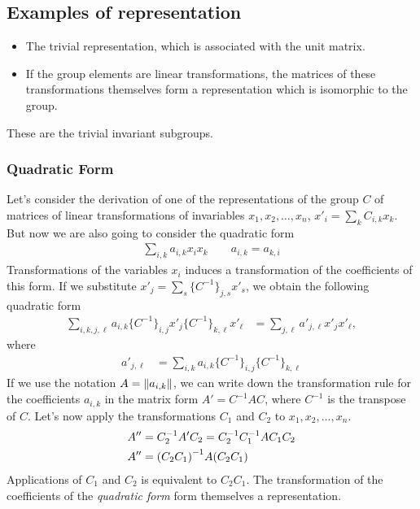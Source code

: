 \subsection{Examples of representation} %
\label{sub:Examples of representation}

\begin{itemize}
    \item The trivial representation, which is associated with the unit matrix.
    \item If the group elements are linear transformations, the matrices of these
        transformations themselves form a representation which is isomorphic to
        the group.
\end{itemize}
These are the trivial invariant subgroups.

\subsubsection{Quadratic Form}
Let's consider the derivation of one of the representations of the group
$C$ of matrices of linear transformations of invariables
$x_1,x_2,\dots,x_n$, $x'_i=\sum_kC_{i,k}x_k$. But now we are also going
to consider the quadratic form
\begin{align}
    \sum_{i,k}a_{i,k}x_ix_k\qquad a_{i,k}=a_{k,i}
\end{align}
Transformations of the variables $x_i$ induces a transformation of the
coefficients of this form. If we substitute
$x'_j=\sum_s\{C^{-1}\}_{j,s}x'_s$, we obtain the following quadratic form
\begin{align}
    \sum_{i,k,j,\ell}a_{i,k}\{C^{-1}\}_{i,j}x'_j\{C^{-1}\}_{k,\ell}x'_\ell
    &=\sum_{j,\ell}a'_{j,\ell}x'_jx'_\ell,
\end{align}
where
\begin{align}
    a'_{j,\ell}&=\sum_{i,k}a_{i,k}\{C^{-1}\}_{i,j}\{C^{-1}\}_{k,\ell}
\end{align}
If we use the notation $A=\norm{a_{i,k}}$, we can write down the transformation
rule for the coefficients $a_{i,k}$ in the matrix form $A'=C^{-1}AC$,
where $C^{-1}$ is the transpose of $C$. Let's now apply the
transformations $C_1$ and $C_2$ to $x_1,x_2,\dots,x_n$.
\begin{align}
    A''&=C_2^{-1}A'C_2=C_2^{-1}C_1^{-1}AC_1C_2\\
    A''&=\qty(C_2C_1)^{-1}A\qty(C_2C_1)
\end{align}
Applications of $C_1$ and $C_2$ is equivalent to $C_2C_1$. The
transformation of the coefficients of the \emph{quadratic form}
form themselves a representation.

